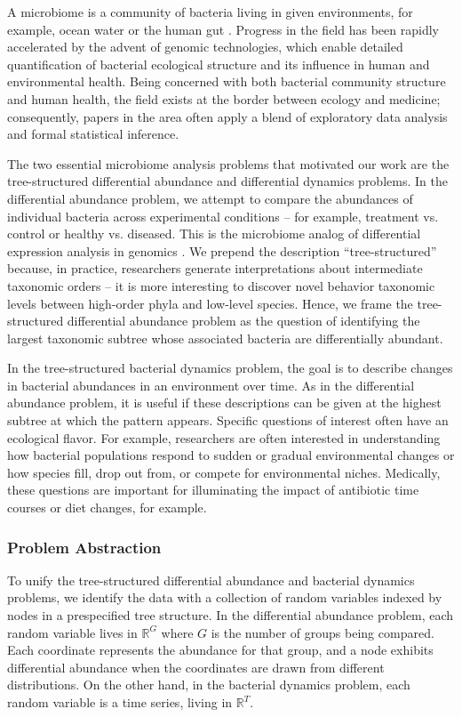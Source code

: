 \documentclass[12pt]{article}
\begin{document}
A microbiome is a community of bacteria living in given environments,
for example, ocean water or the human gut
\citep{human2012structure, cho2012human}. Progress in the field has
been rapidly accelerated by the advent of genomic technologies, which
enable detailed quantification of bacterial ecological structure and its
influence in human and environmental health. Being concerned with both
bacterial community structure and human health, the field exists at the
border between ecology and medicine; consequently, papers in the area
often apply a blend of exploratory data analysis and formal statistical
inference.

The two essential microbiome analysis problems that motivated our work
are the tree-structured differential abundance and differential dynamics
problems. In the differential abundance problem, we attempt to compare
the abundances of individual bacteria across experimental conditions --
for example, treatment vs. control or healthy vs. diseased. This is the
microbiome analog of differential expression analysis in genomics
\citep{anders2010differential}.
We prepend the description ``tree-structured'' because, in practice,
researchers generate interpretations about intermediate taxonomic orders
-- it is more interesting to discover novel behavior taxonomic levels
between high-order phyla and low-level species. Hence, we frame the
tree-structured differential abundance problem as the question of
identifying the largest taxonomic subtree whose associated bacteria are
differentially abundant.

In the tree-structured bacterial dynamics problem, the goal is to
describe changes in bacterial abundances in an environment over time. As
in the differential abundance problem, it is useful if these
descriptions can be given at the highest subtree at which the pattern
appears. Specific questions of interest often have an ecological flavor.
For example, researchers are often interested in understanding how
bacterial populations respond to sudden or gradual environmental changes
or how species fill, drop out from, or compete for environmental niches.
Medically, these questions are important for illuminating the impact of
antibiotic time courses or diet changes, for example.

\subsubsection*{Problem Abstraction}\label{problem-abstraction}

To unify the tree-structured differential abundance and bacterial
dynamics problems, we identify the data with a collection of random
variables indexed by nodes in a prespecified tree structure. In the
differential abundance problem, each random variable lives in
\(\mathbb{R}^{G}\) where \(G\) is the number of groups being compared.
Each coordinate represents the abundance for that group, and a node
exhibits differential abundance when the coordinates are drawn from
different distributions. On the other hand, in the bacterial dynamics
problem, each random variable is a time series, living in
\(\mathbb{R}^{T}\).
\end{document}
